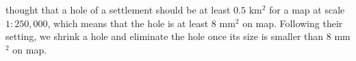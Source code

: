\documentclass[graybox]{svmult}
\begin{document}
\textcite{Chaudhry2008} thought that a hole of a settlement should be at least 
$0.5$ km$^2$ for a map at scale $1:250{,}000$, which means that the hole is at 
least $8$ mm$^2$ on map. Following their setting, we shrink a hole and 
eliminate the hole once its size is smaller than $8$ mm$^2$ on map.







%
%
%
%
%
%
%
%
\end{document}
